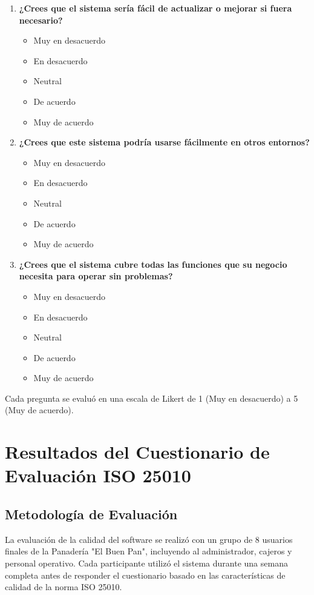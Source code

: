 \documentclass[conference]{IEEEtran}
\begin{document}
\begin{enumerate}
    \item \textbf{¿Crees que el sistema sería fácil de actualizar o mejorar si fuera necesario?}
        \begin{itemize}
            \item Muy en desacuerdo
            \item En desacuerdo
            \item Neutral
            \item De acuerdo
            \item Muy de acuerdo
        \end{itemize}
        
    \item \textbf{¿Crees que este sistema podría usarse fácilmente en otros entornos?}
        \begin{itemize}
            \item Muy en desacuerdo
            \item En desacuerdo
            \item Neutral
            \item De acuerdo
            \item Muy de acuerdo
        \end{itemize}
        
    \item \textbf{¿Crees que el sistema cubre todas las funciones que su negocio necesita para operar sin problemas?}
        \begin{itemize}
            \item Muy en desacuerdo
            \item En desacuerdo
            \item Neutral
            \item De acuerdo
            \item Muy de acuerdo
        \end{itemize}
\end{enumerate}

Cada pregunta se evaluó en una escala de Likert de 1 (Muy en desacuerdo) a 5 (Muy de acuerdo).

\section{Resultados del Cuestionario de Evaluación ISO 25010}

\subsection{Metodología de Evaluación}
La evaluación de la calidad del software se realizó con un grupo de 8 usuarios finales de la Panadería "El Buen Pan", incluyendo al administrador, cajeros y personal operativo. Cada participante utilizó el sistema durante una semana completa antes de responder el cuestionario basado en las características de calidad de la norma ISO 25010.
\end{document}
